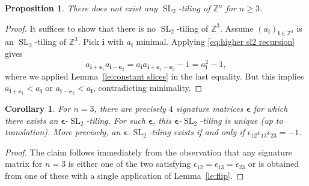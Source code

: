 \documentclass[11pt,reqno]{amsart}
\newtheorem{corollary}[theorem]{Corollary}
\newtheorem{proposition}[theorem]{Proposition}
\newcommand{\bepsilon}{\boldsymbol{\epsilon}}
\newcommand{\be}{\boldsymbol{e}}
\newcommand{\bi}{\boldsymbol{i}}
\newcommand{\SL}{\operatorname{SL}}
\newcommand{\ZZ}{\mathbb{Z}}
\begin{document}
  \begin{proposition}\label{pr:nonexistence}
    There does not exist any $\SL_2$-tiling of $\ZZ^n$ for $n\geq3$.
  \end{proposition}
  \begin{proof}
    It suffices to show that there is no $\SL_2$-tiling of $\ZZ^3$.
    Assume $(a_{\bi})_{\bi\in\ZZ^3}$ is an $\SL_2$-tiling of $\ZZ^3$.
    Pick $\bi$ with $a_{\bi}$ minimal.
    Applying \eqref{eq:higher sl2 recursion} gives
    \[
      a_{\bi+\be_1}a_{\bi-\be_2}=a_{\bi}a_{\bi+\be_1-\be_2}-1=a_{\bi}^2-1,
    \]
    where we applied Lemma~\ref{le:constant slices} in the last equality.
    But this implies $a_{\bi+\be_1}<a_{\bi}$ or $a_{\bi-\be_2}<a_{\bi}$, contradicting minimality.
  \end{proof}

  \begin{corollary}\label{co:n=3}
    For $n=3$, there are precisely $4$ signature matrices $\bepsilon$ for which there exists an $\bepsilon$-$\SL_2$-tiling. 
    For such $\bepsilon$, this $\bepsilon$-$\SL_2$-tiling is unique (up to translation).
    More precisely, an $\bepsilon$-$\SL_2$-tiling exists if and only if $\epsilon_{12}\epsilon_{13}\epsilon_{23}=-1$.
  \end{corollary}
  \begin{proof}
    The claim follows immediately from the observation that any signature matrix for $n=3$ is either one of the two satisfying $\epsilon_{12}=\epsilon_{13}=\epsilon_{23}$ or is obtained from one of these with a single application of Lemma~\ref{le:flip}.
  \end{proof}
\end{document}
